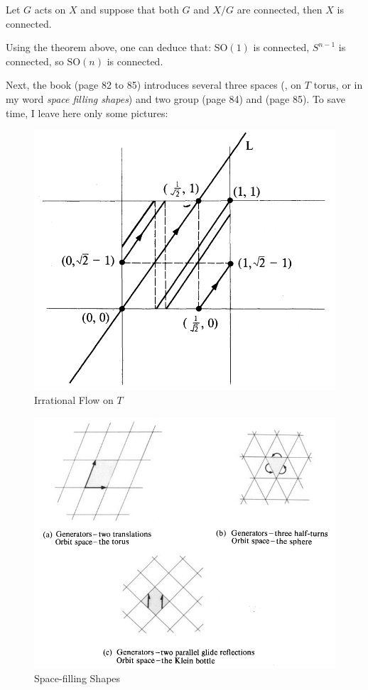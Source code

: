 \begin{thm}
    Let $G$ acts on $X$ and suppose that both $G$ and $X/G$ are
    connected, then $X$ is connected.
\end{thm}
\begin{fact}
    Using the theorem above, one can deduce that: $\mathrm{SO}(1)$ is
    connected, $S^{n-1}$ is connected, so $\mathrm{SO}(n)$ is
    connected.
\end{fact}

Next, the book \cite{book} (page 82 to 85) introduces several three
spaces (,  on $T$ torus,
 or in my word \textit{space filling
shapes}) and two group  (page 84) and
 (page 85). To save time, I leave
here only some pictures:
\begin{figure}[H]
    \centering
    \includegraphics[width=0.8\linewidth]{pics/irrational-flow.png}
    \caption{Irrational Flow on $T$}
\end{figure}
\begin{figure}[H]
    \centering
    \includegraphics[width=0.8\linewidth]{pics/space-filling-shapes.png}
    \caption{Space-filling Shapes}
\end{figure}


